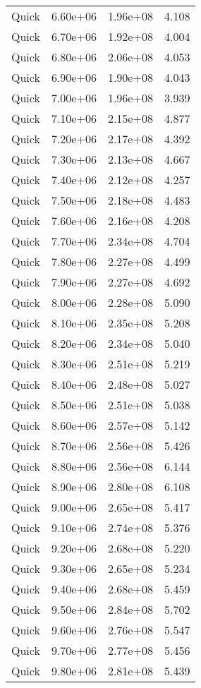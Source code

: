 \begin{table}
\begin{tabular}{llll}
Quick & 6.60e+06 & 1.96e+08 & 4.108 \\
Quick & 6.70e+06 & 1.92e+08 & 4.004 \\
Quick & 6.80e+06 & 2.06e+08 & 4.053 \\
Quick & 6.90e+06 & 1.90e+08 & 4.043 \\
Quick & 7.00e+06 & 1.96e+08 & 3.939 \\
Quick & 7.10e+06 & 2.15e+08 & 4.877 \\
Quick & 7.20e+06 & 2.17e+08 & 4.392 \\
Quick & 7.30e+06 & 2.13e+08 & 4.667 \\
Quick & 7.40e+06 & 2.12e+08 & 4.257 \\
Quick & 7.50e+06 & 2.18e+08 & 4.483 \\
Quick & 7.60e+06 & 2.16e+08 & 4.208 \\
Quick & 7.70e+06 & 2.34e+08 & 4.704 \\
Quick & 7.80e+06 & 2.27e+08 & 4.499 \\
Quick & 7.90e+06 & 2.27e+08 & 4.692 \\
Quick & 8.00e+06 & 2.28e+08 & 5.090 \\
Quick & 8.10e+06 & 2.35e+08 & 5.208 \\
Quick & 8.20e+06 & 2.34e+08 & 5.040 \\
Quick & 8.30e+06 & 2.51e+08 & 5.219 \\
Quick & 8.40e+06 & 2.48e+08 & 5.027 \\
Quick & 8.50e+06 & 2.51e+08 & 5.038 \\
Quick & 8.60e+06 & 2.57e+08 & 5.142 \\
Quick & 8.70e+06 & 2.56e+08 & 5.426 \\
Quick & 8.80e+06 & 2.56e+08 & 6.144 \\
Quick & 8.90e+06 & 2.80e+08 & 6.108 \\
Quick & 9.00e+06 & 2.65e+08 & 5.417 \\
Quick & 9.10e+06 & 2.74e+08 & 5.376 \\
Quick & 9.20e+06 & 2.68e+08 & 5.220 \\
Quick & 9.30e+06 & 2.65e+08 & 5.234 \\
Quick & 9.40e+06 & 2.68e+08 & 5.459 \\
Quick & 9.50e+06 & 2.84e+08 & 5.702 \\
Quick & 9.60e+06 & 2.76e+08 & 5.547 \\
Quick & 9.70e+06 & 2.77e+08 & 5.456 \\
Quick & 9.80e+06 & 2.81e+08 & 5.439 \\

\end{tabular}
\end{table}
